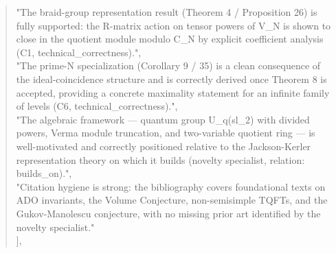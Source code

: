 \documentclass[11pt]{article}
\begin{document}
\begin{quote}
    "The braid-group representation result (Theorem 4 / Proposition 26) is fully supported: the R-matrix action on tensor powers of V\_N is shown to close in the quotient module modulo C\_N by explicit coefficient analysis (C1, technical\_correctness).",\\
    "The prime-N specialization (Corollary 9 / 35) is a clean consequence of the ideal-coincidence structure and is correctly derived once Theorem 8 is accepted, providing a concrete maximality statement for an infinite family of levels (C6, technical\_correctness).",\\
    "The algebraic framework --- quantum group U\_q(sl\_2) with divided powers, Verma module truncation, and two-variable quotient ring --- is well-motivated and correctly positioned relative to the Jackson-Kerler representation theory on which it builds (novelty specialist, relation: builds\_on).",\\
    "Citation hygiene is strong: the bibliography covers foundational texts on ADO invariants, the Volume Conjecture, non-semisimple TQFTs, and the Gukov-Manolescu conjecture, with no missing prior art identified by the novelty specialist."\\
  ],\\

\end{quote}
\end{document}
